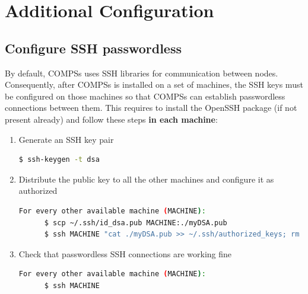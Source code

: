 \section{Additional Configuration}
\label{sec:Additional_Configuration}


\subsection{Configure SSH passwordless}
\label{subsec:Passwordless_ssh}
By default, COMPSs uses SSH libraries for communication between nodes. Consequently, after COMPSs is installed on a set of machines,
the SSH keys must be configured on those machines so that COMPSs can establish passwordless connections between them. This requires
to install the OpenSSH package (if not present already) and follow these steps \textbf{in each machine}:
\begin{enumerate}
 \item Generate an SSH key pair
       \begin{lstlisting}[language=bash]
	  $ ssh-keygen -t dsa
       \end{lstlisting}
 \item Distribute the public key to all the other machines and configure it as authorized
       \begin{lstlisting}[language=bash]
          For every other available machine (MACHINE):
	  $ scp ~/.ssh/id_dsa.pub MACHINE:./myDSA.pub
	  $ ssh MACHINE "cat ./myDSA.pub >> ~/.ssh/authorized_keys; rm ./myDSA.pub"
       \end{lstlisting}
 \item Check that passwordless SSH connections are working fine
       \begin{lstlisting}[language=bash]
          For every other available machine (MACHINE):
	  $ ssh MACHINE
       \end{lstlisting}
\end{enumerate}

